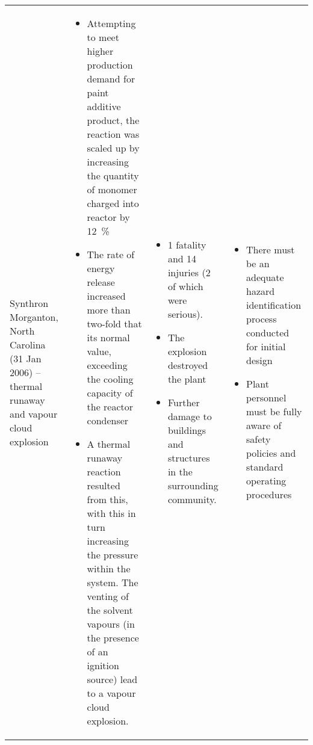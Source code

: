 {\begin{tabular}{@{}p{3cm}p{8cm}p{4cm}p{7cm}@{}}
Synthron  Morganton, North Carolina (31 Jan 2006) – thermal runaway and vapour cloud explosion \cite{csb_synthron_nodate}   & \begin{itemize}[leftmargin=1em]\item Attempting to meet higher production demand for paint additive product, the reaction was scaled up by increasing the quantity of monomer charged into reactor by \SI{12}{\percent} \item The rate of energy release increased more than two-fold that its normal value, exceeding the cooling capacity of the reactor condenser\item A thermal runaway reaction resulted from this, with this in turn increasing the pressure within the system. The venting of the solvent vapours (in the presence of an ignition source) lead to a vapour cloud explosion.\end{itemize}                                                                                                                                           & \begin{itemize}[leftmargin=1em]\item 1 fatality and 14 injuries (2 of which were serious).\item The explosion destroyed the plant\item Further damage to buildings and structures in the surrounding community.\end{itemize}                                                                           & \begin{itemize}[leftmargin=1em]\item There must be an adequate hazard identification process conducted for initial design\item Plant personnel must be fully aware of safety policies and standard operating procedures\end{itemize}                                                                                                                                                                                                                                                                                                                                                                                   \\

\end{tabular}}
